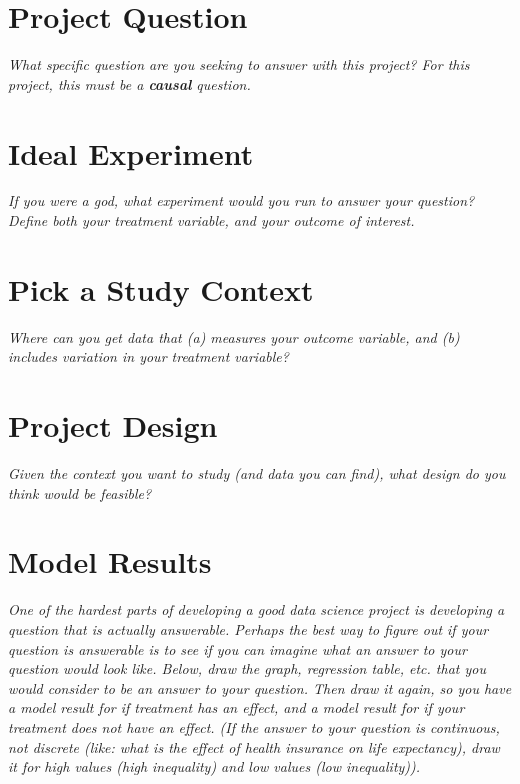 \documentclass[12pt]{article}
\begin{document}
\section{Project Question}
\emph{What specific question are you seeking to answer with this project? For this project, this must be a \textbf{causal} question.}
\vspace*{1cm}\\

\section{Ideal Experiment}
\emph{If you were a god, what experiment would you run to answer your question? Define both your treatment variable, and your outcome of interest.}
\vspace*{1cm}\\

\section{Pick a Study Context}
\emph{Where can you get data that (a) measures your outcome variable, and (b) includes variation in your treatment variable?}
\vspace*{1cm}\\

\section{Project Design}
\emph{Given the context you want to study (and data you can find), what design do you think would be feasible?}
\vspace*{1cm}\\


\section{Model Results}
\emph{One of the hardest parts of developing a good data science project is developing a question that is actually answerable. Perhaps the best way to figure out if your question is answerable is to see if you can imagine what an answer to your question would look like. Below, draw the graph, regression table, etc. that you would consider to be an answer to your question. Then draw it again, so you have a model result for if treatment has an effect, and a model result for if  your treatment does not have an effect. (If the answer to your question is continuous, not discrete (like: what is the effect of health insurance on life expectancy), draw it for high values (high inequality) and low values (low inequality)).}
\end{document}
